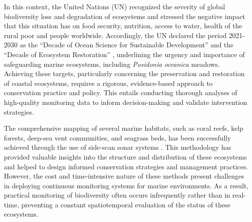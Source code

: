 In this context, the United Nations (UN) recognized the severity of global
biodiversity loss and degradation of ecosystems and stressed the negative
impact that this situation has on food security, nutrition, access to water,
health of the rural poor and people worldwide. Accordingly, the UN declared the
period 2021-2030 as the ``Decade of Ocean Science for Sustainable Development''
and the ``Decade of Ecosystem Restoration'' \cite{UNdecade2000, UNRio},
underlining the urgency and importance of safeguarding marine ecosystems,
including \textit{Posidonia oceanica} meadows. Achieving these targets,
particularly concerning the preservation and restoration of coastal ecosystems,
requires a rigorous, evidence-based approach to
conservation practice and policy. This entails conducting thorough analyses of
high-quality monitoring data to inform decision-making and validate
intervention strategies.

The comprehensive mapping of several marine habitats,
such as coral reefs, kelp forests, deep-sea vent communities, and seagrass
beds, has been successfully achieved through the use of side-scan sonar systems
\cite{Mumby2002, Mishra2006, LeQuilleuc2022, allen-coral-atlas}. This
methodology has provided valuable insights into the structure and distribution
of these ecosystems and helped to design informed conservation strategies and
management practices. However, the cost and time-intensive nature of these
methods present challenges in deploying continuous monitoring systems for
marine environments. As a result, practical monitoring of biodiversity often
occurs infrequently rather than in real-time, preventing a constant
spatiotemporal evaluation of the status of these ecosystems.

